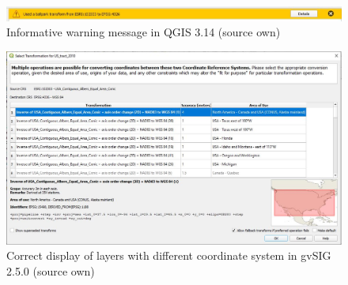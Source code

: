 \documentclass[a4paper,10pt,twoside]{article}
\begin{document}
\begin{figure}[hbt!] 
\begin{center}
\includegraphics[width=17cm]{../pictures/qgis_warning_window.JPG} 
\caption[Informative warning message  in QGIS 3.14 (source own)]{Informative warning message  in QGIS 3.14 (source own)}
\label{fig:qgis_warning_window}
\end{center}
\end{figure}

\begin{figure}[hbt!] 
\begin{center}
\includegraphics[width=14cm]{../pictures/qgis_transformation.JPG} 
\caption[Correct display of layers with different coordinate system in gvSIG 2.5.0 (source own)]{Correct display of layers with different coordinate system in gvSIG 2.5.0 (source own)}
\label{fig:qgis_transformation}
\end{center}
\end{figure}
\end{document}
